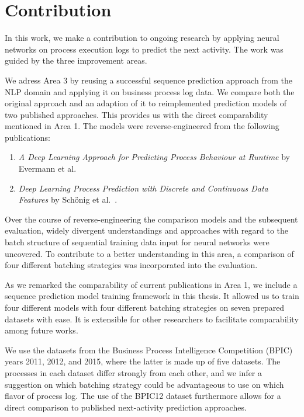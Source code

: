 \section{Contribution}\label{sec:intro:contribution}
In this work, we make a contribution to ongoing research by applying neural networks on process execution logs to predict the next activity. The work was guided by the three improvement areas.

We adress Area 3 by reusing a successful sequence prediction approach from the NLP domain and applying it on business process log data. We compare both the original approach and an adaption of it to reimplemented prediction models of two published approaches. This provides us with the direct comparability mentioned in Area 1. The models were reverse-engineered from the following publications:

\begin{enumerate}
    \item\textit{A Deep Learning Approach for Predicting Process Behaviour at Runtime} by Evermann et al.~\cite{evermann2016}
    \item\textit{Deep Learning Process Prediction with Discrete and Continuous Data Features} by Schönig et al.~\cite{schoenig2018}.
\end{enumerate}

Over the course of reverse-engineering the comparison models and the subsequent evaluation, widely divergent understandings and approaches with regard to the batch structure of sequential training data input for neural networks were uncovered. To contribute to a better understanding in this area, a comparison of four different batching strategies was incorporated into the evaluation.

As we remarked the comparability of current publications in Area 1, we include a sequence prediction model training framework in this thesis. It allowed us to train four different models with four different batching strategies on seven prepared datasets with ease. It is extensible for other researchers to facilitate comparability among future works.

We use the datasets from the Business Process Intelligence Competition (BPIC) years 2011, 2012, and 2015, where the latter is made up of five datasets. The processes in each dataset differ strongly from each other, and we infer a suggestion on which batching strategy could be advantageous to use on which flavor of process log. The use of the BPIC12 dataset furthermore allows for a direct comparison to published next-activity prediction approaches.


